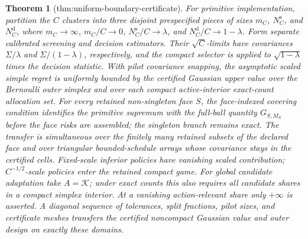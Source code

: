 \documentclass{article}
\newtheorem{theorem}{Theorem}
\begin{document}
\begin{theorem}[thm:uniform-boundary-certificate]
For primitive implementation, partition the \(C\) clusters into three disjoint prespecified pieces of sizes \(m_C\), \(N_C^{\mathrm s}\), and \(N_C^{\mathrm d}\), where \(m_C\to\infty\), \(m_C/C\to0\), \(N_C^{\mathrm s}/C\to\lambda\), and \(N_C^{\mathrm d}/C\to1-\lambda\).  Form separate calibrated screening and decision estimators.  Their \(\sqrt C\)-limits have covariances \(\Sigma/\lambda\) and \(\Sigma/(1-\lambda)\), respectively, and the compact selector is applied to \(\sqrt{1-\lambda}\) times the decision statistic.  With pilot covariance snapping, the asymptotic scaled simple regret is uniformly bounded by the certified Gaussian upper value over the Bernoulli outer simplex and over each compact active-interior exact-count allocation set.  For every retained non-singleton face \(S\), the face-indexed covering condition identifies the primitive supremum with the full-ball quantity \(G_{S,M_S}\) before the face risks are assembled; the singleton branch remains exact.  The transfer is simultaneous over the finitely many retained subsets of the declared face and over triangular bounded-schedule arrays whose covariance stays in the certified cells.  Fixed-scale inferior policies have vanishing scaled contribution; \(C^{-1/2}\)-scale policies enter the retained compact game.  For global candidate adaptation take \(A=\mathcal K\); under exact counts this also requires all candidate shares in a compact simplex interior.  At a vanishing action-relevant share only \(+\infty\) is asserted.  A diagonal sequence of tolerances, split fractions, pilot sizes, and certificate meshes transfers the certified noncompact Gaussian value and outer design on exactly these domains.
\end{theorem}
\end{document}
